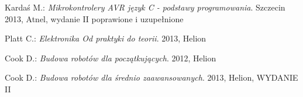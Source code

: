 \documentclass[a4paper,12pt,twoside,openany]{report}
\begin{document}
\begin{thebibliography}{99}
 {
Kardaś M.:
\textit{Mikrokontrolery AVR język C - podstawy programowania}. 
Szczecin 2013, Atnel, wydanie II poprawione i uzupełnione}

 {
Platt C.:
\textit{Elektronika Od praktyki do teorii}. 
2013, Helion}

 {
Cook D.:
\textit{Budowa robotów dla początkujących}. 
2012, Helion}

 {
Cook D.:
\textit{Budowa robotów dla średnio zaawansowanych}. 
2013, Helion, WYDANIE II}

\end{thebibliography}

\zakonczenie  %
\end{document}
